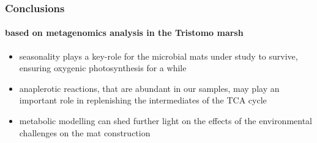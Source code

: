 \documentclass{beamer}
\begin{document}
   \begin{frame}
      \frametitle{Conclusions}
      \framesubtitle{based on metagenomics analysis in the Tristomo marsh}

      \begin{itemize}
         \small
         \item seasonality plays a key-role for the microbial mats under study to survive, ensuring oxygenic photosynthesis for a while 
         \item anaplerotic reactions, that are abundant in our samples, may play an important role in replenishing the intermediates of the TCA cycle
         \item metabolic modelling can shed further light on the effects of the environmental challenges on the mat construction 
      \end{itemize}

   \end{frame}

\end{document}

